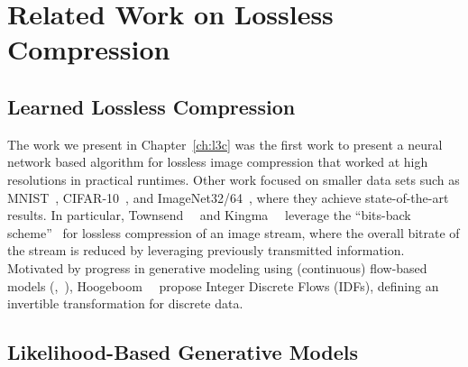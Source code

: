 \chapter{Related Work on Lossless Compression} \label{ch:rel:ll}

\section{Learned Lossless Compression}

The work we present in
Chapter~\ref{ch:l3c}  was the first work to present a neural
network based algorithm for lossless image compression that worked at high
resolutions in practical runtimes.  
Other work focused on smaller data sets such as MNIST~\cite{lecun2010mnist},
CIFAR-10~\cite{krizhevsky09learningmultiple},
and ImageNet32/64~\cite{chrabaszcz2017downsampled},
where they achieve state-of-the-art results.
In particular, Townsend~\etal~\cite{townsend2019practical}
and Kingma~\etal~\cite{kingma2019bit} leverage the ``bits-back
scheme''~\cite{hinton1993keeping} for lossless compression of an image stream,
where the overall bitrate of the stream is reduced by leveraging previously
transmitted information.  Motivated by progress in generative modeling using
(continuous) flow-based models
(\eg,~\cite{rezende2015variational,kingma2016improved}),
Hoogeboom~\etal~\cite{hoogeboom2019integer} propose Integer Discrete Flows
(IDFs), defining an invertible transformation for discrete data.  

\section{Likelihood-Based Generative Models} \label{rel:sec:llbased}

